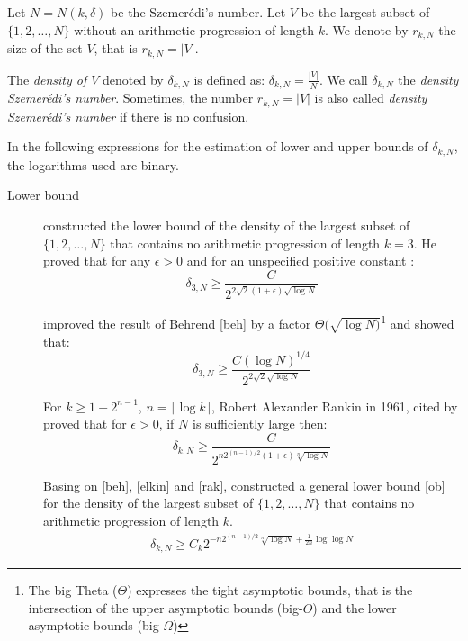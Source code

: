 \begin{defn} Let $N=N(k, \delta)$ be the Szemerédi's number. Let $V$ be the largest subset of $\{1,2,\ldots, N \}$ without an arithmetic progression of length $k.$ We denote by $r_{k,N}$ the size of the set $V$, that is  $r_{k,N}= |V|.$

The \textit{density of $V$} denoted by $\delta_{k,N}$ is defined as: $\delta_{k,N}=\frac{|V|}{N}.$ We call  $\delta_{k,N}$ the \textit{density Szemerédi's number}. Sometimes, the number $r_{k,N}= |V|$ is also called \textit{density Szemerédi's number} if there is no confusion.
\end{defn}

In the following expressions for the estimation of lower and upper bounds of $\delta_{k,N}$, the logarithms used are binary.
\begin{description}
\item[Lower bound]
\cite{behrend1946sets} constructed the lower bound of the density of the largest subset of $\{1,2, \ldots, N\}$ that contains no arithmetic progression of length $k=3$. He proved that for any $\epsilon >0$ and for an unspecified positive constant :
\begin{equation}
\delta_{3,N} \geq \frac{C}{2^{2\sqrt{2}(1+\epsilon) \sqrt{\log N}}} \label{beh}
\end{equation}

\cite{elkin2010improved} improved the result of Behrend \eqref{beh} by a factor $\Theta (\sqrt{\log N)}$\footnote{The big Theta ($\Theta$) expresses the tight asymptotic  bounds, that is the intersection of  the upper asymptotic bounds (big-$O$) and the lower asymptotic bounds (big-$\Omega$) } and showed that:
\begin{equation}
\delta_{3,N} \geq \frac{C (\log N)^{1/4}}{2^{2\sqrt{2} \sqrt{\log N}}} \label{elkin}
\end{equation}

For $k \geq 1+2^{n-1}$,  $n=\lceil \log k \rceil$, Robert Alexander Rankin in 1961, cited by \cite{o2011sets} proved that for $\epsilon >0$,  if $N$ is sufficiently large then:
\begin{equation}
\delta_{k,N} \geq \frac{C}{2^{n2^{(n-1)/2}(1+\epsilon) \sqrt[n]{\log N}}} \label{rak}
\end{equation}


Basing on \eqref{beh}, \eqref{elkin} and \eqref{rak}, \cite{o2011sets} constructed  a general lower bound \eqref{ob} for the density of the largest subset of $\{1,2, \ldots, N\}$ that contains no arithmetic progression of length $k.$
\begin{align}
\delta_{k,N} \geq C_k 2^{-n2^{(n-1)/2} \sqrt[n]{\log N} +\frac{1}{2n} \log \log N } \label{ob}
\end{align}


\end{description}
